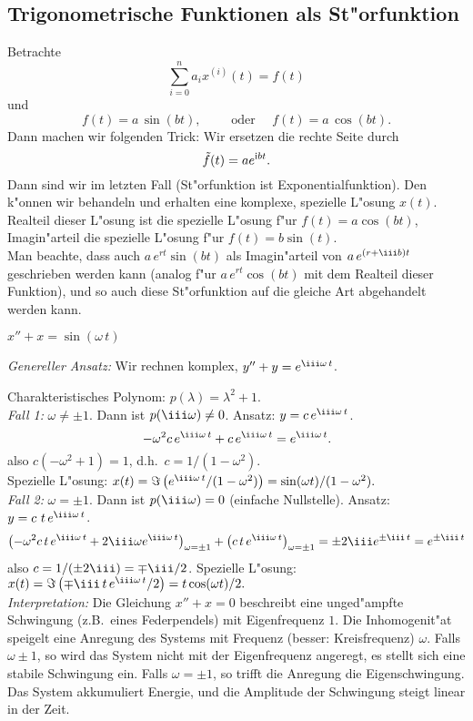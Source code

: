 \subsection{Trigonometrische Funktionen als St"orfunktion}
Betrachte  
$$ \sum_{i=0}^n a_i x^{(i)}(t) = f(t)$$
und
$$ f(t) = a\,\sin(bt),\qquad\mbox{ oder }\quad f(t) = a\,\cos(bt).$$
Dann machen wir folgenden Trick: Wir ersetzen die rechte
Seite durch 
$$\tilde f(t) = a e^{{\rm i} b t}.$$
Dann sind wir im letzten Fall (St"orfunktion ist Exponentialfunktion). Den k"onnen 
wir behandeln und erhalten eine komplexe, spezielle L"osung $x(t)$. Realteil 
dieser L"osung ist die spezielle L"osung f"ur $f(t) = a \cos(bt)$, Imagin"arteil die
spezielle L"osung f"ur $f(t) = b\sin(t)$.\\
Man beachte, dass auch $a\,e^{rt}\sin(bt)$ als Imagin"arteil von 
$a\,e^{(r+\iii b)t}$ geschrieben werden kann (analog f"ur 
$a\,e^{rt}\cos(bt)$ mit dem Realteil dieser Funktion), und so auch diese St"orfunktion auf die gleiche Art abgehandelt werden kann.\par

\begin{bspX} $x''+x=\sin(\omega\,t)$\par
{\it Genereller Ansatz:} Wir rechnen komplex, $y''+y=e^{\iii\omega\,t}$.\par
Charakteristisches Polynom: $p(\lambda)=\lambda^2+1$.\\
{\it Fall 1:} $\omega\not=\pm 1$. Dann ist $p(\iii\omega)\not = 0$. 
Ansatz: $y=c\, e^{\iii\omega\,t}$. 
$$ -\omega^2 c\, e^{\iii\omega\,t}+c\,e^{\iii\omega\,t} = e^{\iii\omega\,t}.$$
also $c(-\omega^2+1)=1$, d.h.\ $c=1/(1-\omega^2)$. \\
Spezielle L"osung: 
$x(t) 
= \Im\left(e^{\iii\omega\,t}/(1-\omega^2)\right)
= \sin(\omega t)/(1-\omega^2).$\\
{\it Fall 2:} $\omega = \pm1$. Dann ist $p(\iii\omega) = 0$ 
(einfache Nullstelle). 
Ansatz: $y=c\, \,t\,e^{\iii\omega\,t}$. 
$$ \left(-\omega^2 c\, t\, e^{\iii\omega\,t}
 + 2\iii\omega e^{\iii\omega\,t}\right)_{\omega=\pm 1}
+\left(c\,t\,e^{\iii\omega\,t}\right)_{\omega=\pm 1}
= \pm 2\iii e^{\pm\iii\,t}
= e^{\pm\iii\,t}$$
also $c = 1/(\pm 2 \iii)=\mp\iii/2$. 
Spezielle L"osung:  
$x(t) 
= \Im\left(\mp\iii\,t\,e^{\iii\omega\,t}/2\right)
= t\cos(\omega t)/2.$\\
{\it Interpretation:} Die Gleichung $x''+x=0$ beschreibt eine 
unged"ampfte Schwingung (z.B.\ eines Federpendels) 
mit Eigenfrequenz $1$. Die Inhomogenit"at speigelt eine Anregung des
Systems mit Frequenz (besser: Kreisfrequenz) $\omega$. 
Falls $\omega\pm 1$, so wird das System nicht mit der Eigenfrequenz angeregt, es stellt sich eine stabile Schwingung ein. Falls $\omega=\pm 1$, so trifft die Anregung die Eigenschwingung. 
Das System akkumuliert Energie, und die Amplitude der Schwingung steigt linear in der Zeit.
\end{bspX}

